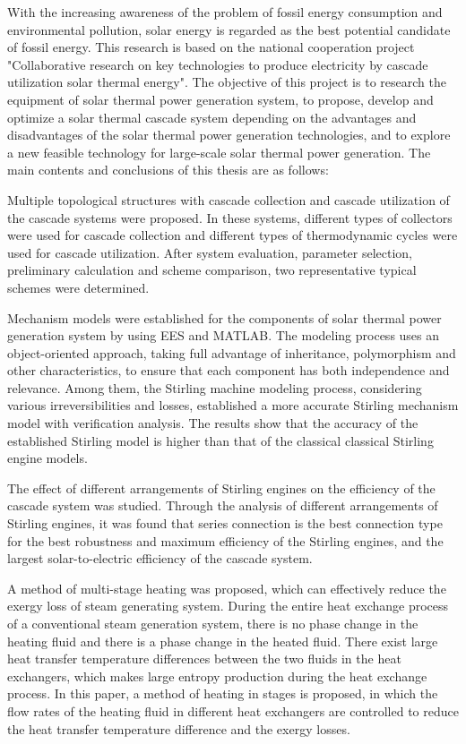 \enabstract
{
With the increasing awareness of the problem of fossil energy consumption and environmental pollution, solar energy is regarded as the best potential candidate of fossil energy. This research is based on the national cooperation project "Collaborative research on key technologies to produce electricity by cascade utilization solar thermal energy". The objective of this project is to research the equipment of solar thermal power generation system, to propose, develop and optimize a solar thermal cascade system depending on the advantages and disadvantages of the solar thermal power generation technologies, and to explore a new feasible technology for large-scale solar thermal power generation. The main contents and conclusions of this thesis are as follows:

Multiple topological structures with cascade collection and cascade utilization of the cascade systems were proposed. In these systems, different types of collectors were used for cascade collection and different types of thermodynamic cycles were used for cascade utilization. After system evaluation, parameter selection, preliminary calculation and scheme comparison, two representative typical schemes were determined.

Mechanism models were established for the components of solar thermal power generation system by using EES and MATLAB. The modeling process uses an object-oriented approach, taking full advantage of inheritance, polymorphism and other characteristics, to ensure that each component has both independence and relevance. Among them, the Stirling machine modeling process, considering various irreversibilities and losses, established a more accurate Stirling mechanism model with verification analysis. The results show that the accuracy of the established Stirling model is higher than that of the classical classical Stirling engine models.

The effect of different arrangements of Stirling engines on the efficiency of the cascade system was studied. Through the analysis of different arrangements of Stirling engines, it was found that series connection is the best connection type for the best robustness and maximum efficiency of the Stirling engines, and the largest solar-to-electric efficiency of the cascade system.

A method of multi-stage heating was proposed, which can effectively reduce the exergy loss of steam generating system. During the entire heat exchange process of a conventional steam generation system, there is no phase change in the heating fluid and there is a phase change in the heated fluid. There exist large heat transfer temperature differences between the two fluids in the heat exchangers, which makes large entropy production during the heat exchange process. In this paper, a method of heating in stages is proposed, in which the flow rates of the heating fluid in different heat exchangers are controlled to reduce the heat transfer temperature difference and the exergy losses. 

}
